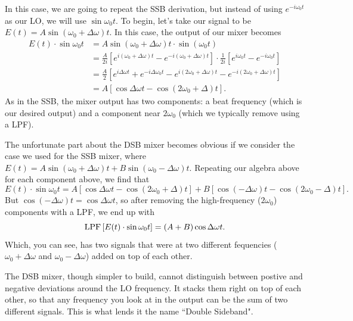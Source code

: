 \documentclass[12pt,preprint]{aastex}
\begin{document}
In this case, we are going to repeat the SSB derivation, but instead of
using $e^{-i\omega_0t}$ as our LO, we will use $\sin \omega_0 t$.  To begin,
let's take our signal to be $E(t)=A\sin(\omega_0+\Delta\omega)t$.  In this case,
the output of our mixer becomes
\begin{align}
E(t)\cdot \sin\omega_0t &= A\sin (\omega_0+\Delta\omega)t\cdot \sin (\omega_0t)\\
&= \frac{A}{2i}\left[e^{i(\omega_0+\Delta\omega)t}-e^{-i(\omega_0+\Delta\omega)t}\right]\cdot
  \frac{1}{2i}\left[e^{i\omega_0t}-e^{-i\omega_0t}\right] \\
&= \frac{A}{2}\left[e^{i\Delta\omega t}+e^{-i\Delta\omega_0t} -
  e^{i(2\omega_0+\Delta\omega) t}-e^{-i(2\omega_0+\Delta\omega)t}\right]\\
&= A\left[\cos\Delta\omega t - \cos(2\omega_0+\Delta)t\right].
\end{align}
As in the SSB, the mixer output has two components: a beat frequency (which is our
desired output) and a component near $2\omega_0$ (which we typically remove using a LPF).

The unfortunate part about the DSB mixer becomes obvious if we consider the
case we used for the SSB mixer, where $E(t)=A\sin(\omega_0+\Delta\omega)t + B\sin(\omega_0-\Delta\omega)t$.
Repeating our algebra above for each component above, we find that
\begin{equation}
E(t)\cdot \sin\omega_0t = 
A\left[\cos\Delta\omega t - \cos(2\omega_0+\Delta)t\right] +
B\left[\cos(-\Delta\omega) t - \cos(2\omega_0-\Delta)t\right].
\end{equation}
But $\cos(-\Delta\omega)t=\cos\Delta\omega t$, so after removing the high-frequency ($2\omega_0$) components
with a LPF, we end up with
\begin{equation}
{\rm LPF}\left[E(t)\cdot \sin\omega_0t\right] = (A+B)\cos\Delta\omega t.
\end{equation}
Which, you can see, has two signals that were at two different fequencies 
($\omega_0+\Delta\omega$ and $\omega_0-\Delta\omega$)
added on top of each other.

The DSB mixer, though simpler to build, cannot distinguish between postive and negative deviations around
the LO frequency.  It stacks them right on top of each other, so that any frequency you look at in the output
can be the sum of two different signals.  This is what lends it the name ``Double Sideband".
\end{document}
